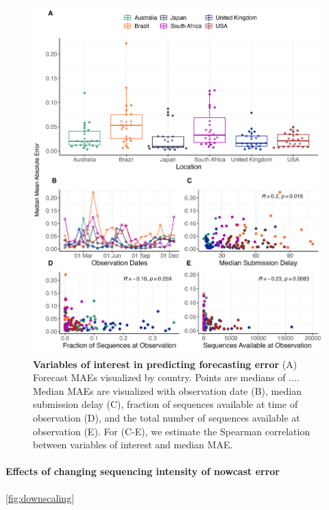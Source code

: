 \documentclass[11pt,oneside,letterpaper]{article}
\begin{document}
\begin{figure}[H]
	\centering
    \includegraphics[width=1.1\textwidth]{figures/Var_of_interest.png}
	\caption{\textbf{Variables of interest in predicting forecasting error}
    (A) Forecast MAEs visualized by country. Points are medians of ....
    Median MAEs are visualized with observation date (B), 
    median submission delay (C), 
    fraction of sequences available at time of observation (D), 
    and the total number of sequences available at observation (E).
    For (C-E), we estimate the Spearman correlation between variables of interest and median MAE.
	}
	\label{fig:vars_of_interest}
\end{figure}

\paragraph{Effects of changing sequencing intensity of nowcast error}%

\ref{fig:downscaling}
\end{document}
